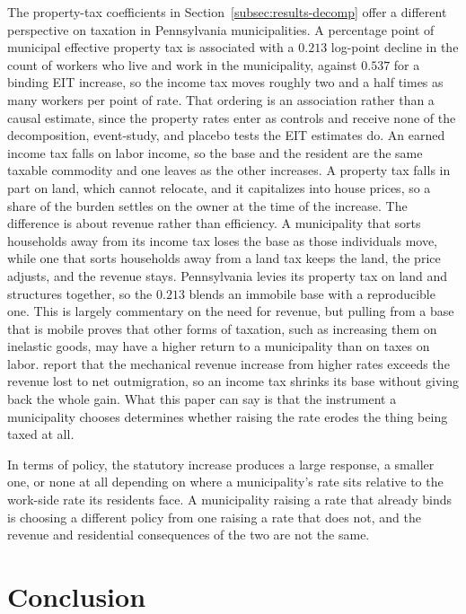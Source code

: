 \documentclass[12pt]{article}
\begin{document}
The property-tax coefficients in Section~\ref{subsec:results-decomp} offer a different perspective on taxation in Pennsylvania municipalities. A percentage point of municipal effective
property tax is associated with a $0.213$ log-point decline in the count
of workers who live and work in the municipality, against $0.537$ for a
binding EIT increase, so the income tax moves roughly two and a half times
as many workers per point of rate. That ordering is an
association rather than a causal estimate, since the property rates
enter as controls and receive none of the decomposition, event-study, and
placebo tests the EIT estimates do. An earned income tax falls on labor income, so
the base and the resident are the same taxable commodity and one leaves as the other increases. A property tax falls in part on land, which cannot relocate, and it
capitalizes into house prices, so a share of the burden settles on the
owner at the time of the increase. The difference is about revenue rather than efficiency. A
municipality that sorts households away from its income tax loses the base as those individuals move, while one that sorts households away from a land tax
keeps the land, the price adjusts, and the revenue stays. Pennsylvania
levies its property tax on land and structures together, so the $0.213$
blends an immobile base with a reproducible one. This is largely commentary on the need for revenue, but pulling from a base that is mobile proves that other forms of taxation, such as increasing them on inelastic goods, may have a higher return to a municipality than on taxes on labor. \citet{agrawalRelocationRichMigration2019} report that the
mechanical revenue increase from higher rates exceeds the revenue lost to
net outmigration, so an income tax shrinks its base without giving back
the whole gain. What this paper can say is that the instrument a
municipality chooses determines whether raising the rate erodes the thing
being taxed at all.

In terms of policy, the statutory increase produces a large response, a smaller one, or
none at all depending on where a municipality's rate sits relative to the
work-side rate its residents face. A municipality raising a rate that
already binds is choosing a different policy from one raising a rate that
does not, and the revenue and residential
consequences of the two are not the same.

\section{Conclusion}
\label{sec:conclusion}
\end{document}
